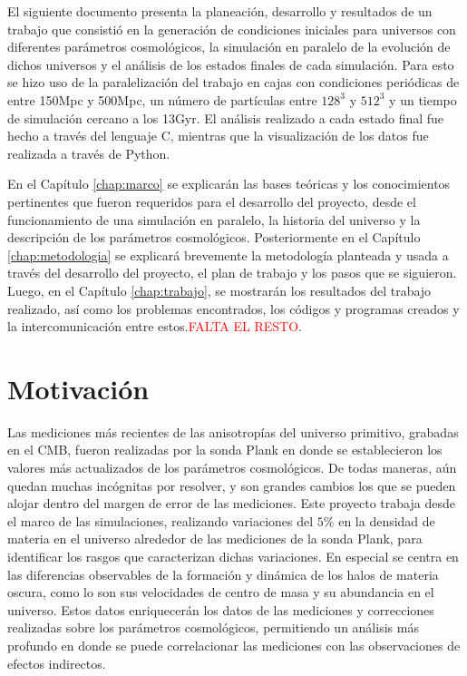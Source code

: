 El siguiente documento presenta la planeación, desarrollo y resultados de un trabajo que consistió en la generación de condiciones iniciales para universos con diferentes parámetros cosmológicos, la simulación en paralelo de la evolución de dichos universos y el análisis de los estados finales de cada simulación. Para esto se hizo uso de la paralelización del trabajo en cajas con condiciones periódicas de entre 150Mpc y 500Mpc, un número de partículas entre $128^3$ y $512^3$ y un tiempo de simulación cercano a los 13Gyr. El análisis realizado a cada estado final fue hecho a través del lenguaje C, mientras que la visualización de los datos fue realizada a través de Python. 

En el Capítulo \ref{chap:marco} se explicarán las bases teóricas y los conocimientos pertinentes que fueron requeridos para el desarrollo del proyecto, desde el funcionamiento de una simulación en paralelo, la historia del universo y la descripción de los parámetros cosmológicos. Posteriormente en el Capítulo \ref{chap:metodologia} se explicará brevemente la metodología planteada y usada a través del desarrollo del proyecto, el plan de trabajo y los pasos que se siguieron. Luego, en el Capítulo \ref{chap:trabajo}, se mostrarán los resultados del trabajo realizado, así como los problemas encontrados, los códigos y programas creados y la intercomunicación entre estos.\textcolor{red}{FALTA EL RESTO}.

\section{Motivación}
Las mediciones más recientes de las anisotropías del universo primitivo, grabadas en el CMB, fueron realizadas por la sonda Plank en donde se establecieron los valores más actualizados de los parámetros cosmológicos. De todas maneras, aún quedan muchas incógnitas por resolver, y son grandes cambios los que se pueden alojar dentro del margen de error de las mediciones. Este proyecto trabaja desde el marco de las simulaciones, realizando variaciones del $5\%$ en la densidad de materia en el universo alrededor de las mediciones de la sonda Plank, para identificar los rasgos que caracterizan dichas variaciones. En especial se centra en las diferencias observables de la formación y dinámica de los halos de materia oscura, como lo son sus velocidades de centro de masa y su abundancia en el universo. Estos datos enriquecerán los datos de las mediciones y correcciones realizadas sobre los parámetros cosmológicos, permitiendo un análisis más profundo en donde se puede correlacionar las mediciones con las observaciones de efectos indirectos.


